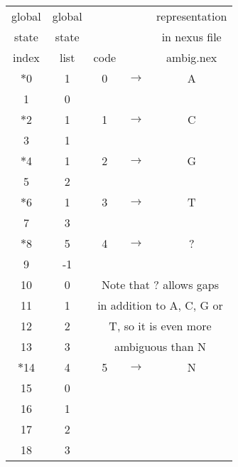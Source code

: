 \begin{center}
\begin{tabular}{ccccc}
 global  & global  &         &    & representation         \\
 state   & state   &         &    & in nexus file          \\
index    &  list   & code    &             & ambig.nex              \\ \hline
$\ast$0  &    1    &    0    & $\longrightarrow$ &  A                     \\
   1     &    0    &         &             &                        \\ \hline
$\ast$2  &    1    &    1    & $\longrightarrow $ &  C                     \\
   3     &    1    &         &             &                        \\ \hline
$\ast$4  &    1    &    2    & $\longrightarrow $ &  G                     \\
   5     &    2    &         &             &                        \\ \hline
$\ast$6  &    1    &    3    & $\longrightarrow $ &  T                     \\
   7     &    3    &         &             &                        \\ \hline
$\ast$8  &    5    &    4    & $\longrightarrow $ &  ?                     \\
   9     &   -1    &         &             &                        \\
  10     &    0    &  \multicolumn{3}{c}{Note that ? allows gaps}   \\
  11     &    1    &  \multicolumn{3}{c}{in addition to A, C, G or} \\
  12     &    2    &  \multicolumn{3}{c}{T, so it is even more}     \\
  13     &    3    &  \multicolumn{3}{c}{ambiguous than N}          \\ \hline
$\ast$14 &    4    &    5    & $\longrightarrow $ &  N                     \\
  15     &    0    &         &             &                        \\
  16     &    1    &         &             &                        \\
  17     &    2    &         &             &                        \\
  18     &    3    &         &             &                        \\ \hline

\end{tabular}
\end{center}
